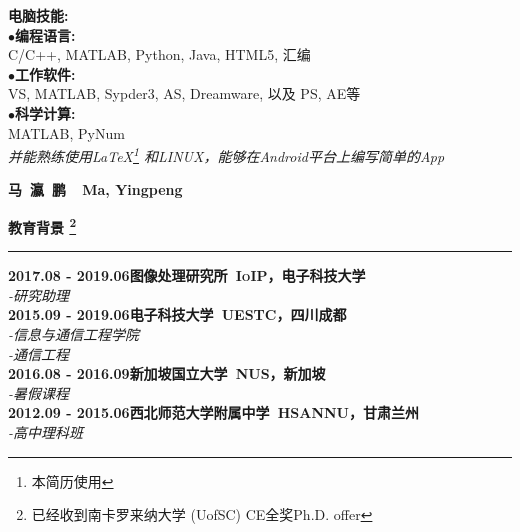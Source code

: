 \documentclass[a4paper,11pt,final]{memoir}
\newcommand{\myThemeColor}{RoyalBlue}
\newcommand{\SmallSep}{\vspace{0.9em}}
\newcommand{\CVSection}[1]
	{\Large\textbf{#1}\par
	\vspace{0.2cm}\normalsize\normalfont}
\newcommand{\CVItem}[1]
	{\textbf{\color{\myThemeColor} #1}}
\begin{document}
\begin{CJK*}{UTF8}{gbsn}
\begin{flushright}
	\CVItem{{\large 电脑技能:}}\\
	$\bullet$\textbf{编程语言:}\\ C/C++, MATLAB, Python, Java, HTML5, 汇编 \\
	$\bullet$\textbf{工作软件:}\\ VS, MATLAB, Sypder3, AS, Dreamware, 以及 PS, AE等 \\
	$\bullet$\textbf{科学计算:}\\ MATLAB, PyNum\\
	\SmallSep
	\textit{并能熟练使用\LaTeX \footnote{本简历使用} 和LINUX，能够在Android平台上编写简单的App}

	
\end{flushright}\normalsize
\framebreak


\Huge\bfseries {\color{\myThemeColor} 马~瀛~鹏~~Ma, Yingpeng}\\
\normalsize\normalfont

\CVSection{教育背景 \footnote{已经收到南卡罗来纳大学 (UofSC) CE全奖Ph.D. offer}}
\hrule
\SmallSep
\CVItem{2017.08 - 2019.06\hfill\textsc{图像处理研究所~IoIP，电子科技大学}}\\
\textit{-研究助理}
\\
\CVItem{2015.09 - 2019.06\hfill\textsc{电子科技大学~UESTC，四川成都}}\\
\textit{-信息与通信工程学院}\\
\textit{-通信工程}
\\
\CVItem{2016.08 - 2016.09\hfill\textsc{新加坡国立大学~NUS，新加坡}}\\
\textit{-暑假课程}
\\
\CVItem{2012.09 - 2015.06\hfill\textsc{西北师范大学附属中学~HSANNU，甘肃兰州}}\\
\textit{-高中理科班}
\\



\end{CJK*}
\end{document}
